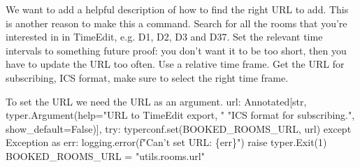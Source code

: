 We want to add a helpful description of how to find the right URL to add.
This is another reason to make this a command.
\nwenddocs{}\endmoddef\nwstartdeflinemarkup{}\nwenddeflinemarkup
Search for all the rooms that you're interested in in TimeEdit,
e.g. D1, D2, D3 and D37.
Set the relevant time intervals to something future proof: you
don't want it to be too short, then you have to update the URL
too often. Use a relative time frame. Get the URL for subscribing,
ICS format, make sure to select the right time frame.
\nwendcode{}\nwdocspar

To set the URL we need the URL as an argument.
\nwenddocs{}\endmoddef\nwstartdeflinemarkup{}\nwenddeflinemarkup
url: Annotated[str,
               typer.Argument(help="URL to TimeEdit export, "
                                   "ICS format for subscribing.",
                              show_default=False)],
\nwendcode{}\endmoddef\nwstartdeflinemarkup{}\nwenddeflinemarkup
try:
  typerconf.set(BOOKED_ROOMS_URL, url)
except Exception as err:
  logging.error(f"Can't set URL: \{err\}")
  raise typer.Exit(1)
\nwendcode{}\endmoddef\nwstartdeflinemarkup{}\nwenddeflinemarkup
BOOKED_ROOMS_URL = "utils.rooms.url"
\nwendcode{}\nwdocspar

